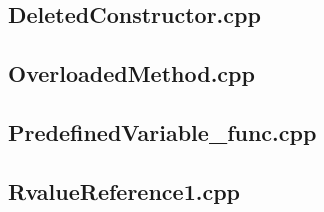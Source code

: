\documentclass[11pt]{report}
\begin{document}
\begin{appendix}
\subsection{DeletedConstructor.cpp}
\label{sub:DeletedConstructor}


\subsection{OverloadedMethod.cpp}
\label{sub:OverloadedMethod.cpp}



\subsection{PredefinedVariable\_func.cpp}
\label{sub:PredefinedVariable_func}


\subsection{RvalueReference1.cpp}
\label{sub:RvalueReference1.cpp}


\end{appendix}
\end{document}
